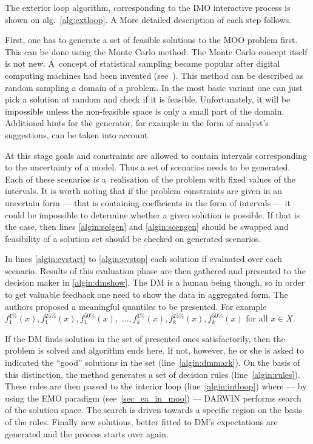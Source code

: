 The exterior loop algorithm, corresponding to the IMO interactive process is
shown on alg.~\ref{alg:extloop}. A More detailed description of each step
follows.

First, one has to generate a set of feasible solutions to the MOO problem
first. This can be done using the Monte Carlo method. The Monte Carlo concept
itself is not new. A~concept of statistical sampling became popular after
digital computing machines had been invented (see~\cite{Met87}). This method
can be described as random sampling a domain of a problem. In the most basic
variant one can just pick a solution at random and check if it is
feasible. Unfortunately, it will be impossible unless the non-feasible space
is only a small part of the domain. Additional hints for the generator, for
example in the form of analyst's suggestions, can be taken into account.

At this stage goals and constraints are allowed to contain intervals
corresponding to the uncertainty of a model. Thus a set of scenarios needs to
be generated. Each of these scenarios is a~realisation of the problem with
fixed values of the intervals. It is worth noting that if the problem
constraints are given in an uncertain form --- that is containing coefficients
in the form of intervals --- it could be impossible to determine whether a
given solution is possible. If that is the case, then lines \ref{algin:solgen}
and \ref{algin:scengen} should be swapped and feasibility of a solution set
should be checked on generated scenarios.

In lines \ref{algin:evstart} to \ref{algin:evstop} each solution if evaluated
over each scenario. Results of this evaluation phase are then gathered and
presented to the decision maker in \ref{algin:dmshow}. The DM is a human being
though, so in order to get valuable feedback one need to show the data in
aggregated form. The authors proposed a meaningful quantiles to be
presented. For example $f^{1\%}_1(x), f^{25\%}_1(x), f^{50\%}_1(x),$ $\dots,
f^{1\%}_k(x), f^{25\%}_k(x), f^{50\%}_k(x)$ for all $x \in X$.

If the DM finds solution in the set of presented ones satisfactorily, then the
problem is solved and algorithm ends here. If not, however, he or she is asked
to indicated the ``good'' solutions in the set (line~\ref{algin:dmmark}).  On
the basis of this distinction, the method generates a set of decision rules
(line~\ref{algin:rules}). These rules are then passed to the interior loop
(line~\ref{algin:intloop}) where --- by using the EMO paradigm
(see~\ref{sec_ea_in_moo}) --- DARWIN performs search of the solution
space. The search is driven towards a specific region on the basis of the
rules. Finally new solutions, better fitted to DM's expectations are generated
and the process starts over again.

